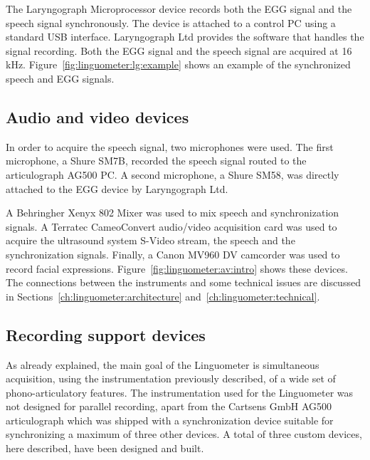 The Laryngograph Microprocessor device records both the EGG signal and the
speech signal synchronously. The device is attached to a control PC using a
standard USB interface. Laryngograph Ltd provides the software that handles the
signal recording.
Both the EGG signal and the speech signal are acquired at 16 kHz. 
Figure~\ref{fig:linguometer:lg:example} shows an example of the synchronized
speech and EGG signals.
\subsection{Audio and video devices}
\label{ch:linguometer:instrumentation:av}
In order to acquire the speech signal, two microphones were used.
The first microphone, a Shure SM7B, recorded the speech signal 
routed to the articulograph AG500 PC.
A second microphone, a Shure SM58, was directly attached to the EGG device
by Laryngograph Ltd.

A Behringher Xenyx 802 Mixer was used to mix speech and synchronization signals.
A Terratec CameoConvert audio/video acquisition card was used to acquire the
ultrasound system S-Video stream, the speech and the synchronization signals.
Finally, a Canon MV960 DV camcorder was used to record facial expressions. 
Figure~\ref{fig:linguometer:av:intro} shows these devices.
The connections between the instruments and some technical issues are discussed
in Sections~\ref{ch:linguometer:architecture}
and~\ref{ch:linguometer:technical}.
\subsection{Recording support devices}
\label{ch:linguometer:instrumentation:custom}
As already explained, the main goal of the Linguometer is
simultaneous acquisition, using the instrumentation previously described, of
a wide set of phono-articulatory features.
The instrumentation used for the Linguometer was not designed for parallel
recording, apart from the Cartsens GmbH AG500 articulograph 
which was shipped with a
synchronization device suitable for synchronizing a maximum of three
other devices.
A total of three custom devices, here described, have been designed and built.

